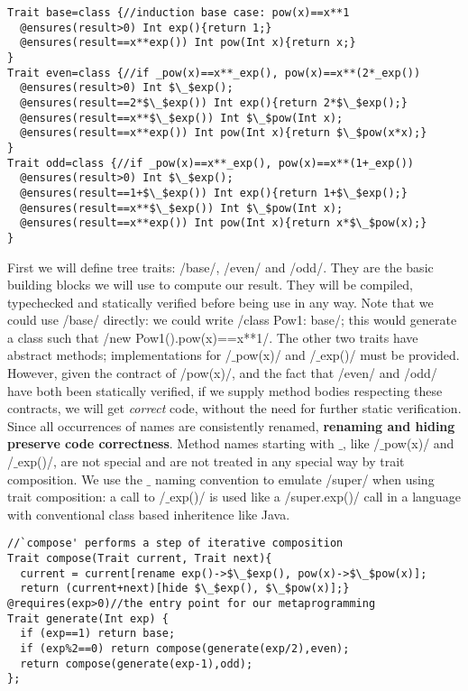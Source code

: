\begin{lstlisting}
Trait base=class {//induction base case: pow(x)==x**1
  @ensures(result>0) Int exp(){return 1;}  
  @ensures(result==x**exp()) Int pow(Int x){return x;}
}
Trait even=class {//if _pow(x)==x**_exp(), pow(x)==x**(2*_exp())
  @ensures(result>0) Int $\_$exp();
  @ensures(result==2*$\_$exp()) Int exp(){return 2*$\_$exp();}
  @ensures(result==x**$\_$exp()) Int $\_$pow(Int x);
  @ensures(result==x**exp()) Int pow(Int x){return $\_$pow(x*x);}
}
Trait odd=class {//if _pow(x)==x**_exp(), pow(x)==x**(1+_exp())
  @ensures(result>0) Int $\_$exp();
  @ensures(result==1+$\_$exp()) Int exp(){return 1+$\_$exp();}
  @ensures(result==x**$\_$exp()) Int $\_$pow(Int x);
  @ensures(result==x**exp()) Int pow(Int x){return x*$\_$pow(x);}
}
\end{lstlisting}
First we will define tree traits: /base/, /even/ and /odd/.
They are the basic building blocks we will use to compute our result. They will be compiled, typechecked and statically verified before being use in any way.
Note that we could use /base/ directly:
we could write /class Pow1: base/; this would generate a class such that /new Pow1().pow(x)==x**1/.
The other two traits have abstract methods; implementations for /$\_$pow(x)/ and /$\_$exp()/ must be provided. However, given the contract of /pow(x)/,
and the fact that /even/ and /odd/ have both been statically verified,
if we supply method bodies respecting these contracts, we will get \emph{correct} code, without the need for further static verification.
Since all occurrences of names are consistently renamed, \textbf{renaming and hiding preserve code correctness}.
Method names starting with $\_$, like /$\_$pow(x)/ and /$\_$exp()/, are not special and are not treated in any special way by trait composition. We use the $\_$ naming convention to emulate /super/ when using trait composition: a call to /$\_$exp()/ is used like a /super.exp()/ call in a language with conventional class based inheritence like Java.

\begin{lstlisting}
//`compose' performs a step of iterative composition
Trait compose(Trait current, Trait next){
  current = current[rename exp()->$\_$exp(), pow(x)->$\_$pow(x)];
  return (current+next)[hide $\_$exp(), $\_$pow(x)];}
@requires(exp>0)//the entry point for our metaprogramming
Trait generate(Int exp) {
  if (exp==1) return base;
  if (exp%2==0) return compose(generate(exp/2),even);
  return compose(generate(exp-1),odd);
};
\end{lstlisting}
